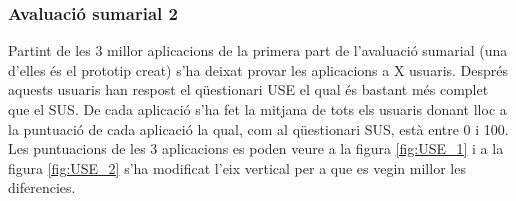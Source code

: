 \subsubsection{Avaluació sumarial 2}
Partint de les 3 millor aplicacions de la primera part de l'avaluació sumarial (una d'elles és el prototip creat) s'ha deixat provar les aplicacions a X usuaris. %
Després aquests usuaris han respost el qüestionari USE el qual és bastant més complet que el SUS. De cada aplicació s'ha fet la mitjana de tots els usuaris donant lloc a la puntuació de cada aplicació la qual, com al qüestionari SUS, està entre 0 i 100. Les puntuacions de les 3 aplicacions es poden veure a la figura \ref{fig:USE_1} i a la figura \ref{fig:USE_2} s'ha modificat l'eix vertical per a que es vegin millor les diferencies.

\begin{figure}
	\centering
	

\end{figure}
